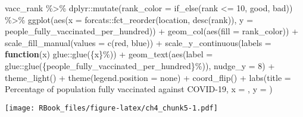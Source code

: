 \documentclass[
]{book}
\newenvironment{Shaded}{\begin{snugshade}}{\end{snugshade}}
\newcommand{\AttributeTok}[1]{\textcolor[rgb]{0.77,0.63,0.00}{#1}}
\newcommand{\ControlFlowTok}[1]{\textcolor[rgb]{0.13,0.29,0.53}{\textbf{#1}}}
\newcommand{\DecValTok}[1]{\textcolor[rgb]{0.00,0.00,0.81}{#1}}
\newcommand{\FunctionTok}[1]{\textcolor[rgb]{0.00,0.00,0.00}{#1}}
\newcommand{\NormalTok}[1]{#1}
\newcommand{\SpecialCharTok}[1]{\textcolor[rgb]{0.00,0.00,0.00}{#1}}
\newcommand{\StringTok}[1]{\textcolor[rgb]{0.31,0.60,0.02}{#1}}
\begin{document}
\begin{Shaded}
\begin{Highlighting}[]
\NormalTok{vacc\_rank }\SpecialCharTok{\%\textgreater{}\%}
\NormalTok{  dplyr}\SpecialCharTok{::}\FunctionTok{mutate}\NormalTok{(}\AttributeTok{rank\_color =} \FunctionTok{if\_else}\NormalTok{(rank }\SpecialCharTok{\textless{}=} \DecValTok{10}\NormalTok{, }\StringTok{\textquotesingle{}good\textquotesingle{}}\NormalTok{, }\StringTok{\textquotesingle{}bad\textquotesingle{}}\NormalTok{)) }\SpecialCharTok{\%\textgreater{}\%} 
  \FunctionTok{ggplot}\NormalTok{(}\FunctionTok{aes}\NormalTok{(}\AttributeTok{x =}\NormalTok{ forcats}\SpecialCharTok{::}\FunctionTok{fct\_reorder}\NormalTok{(location, }\FunctionTok{desc}\NormalTok{(rank)), }
             \AttributeTok{y =}\NormalTok{ people\_fully\_vaccinated\_per\_hundred)) }\SpecialCharTok{+}
  \FunctionTok{geom\_col}\NormalTok{(}\FunctionTok{aes}\NormalTok{(}\AttributeTok{fill =}\NormalTok{ rank\_color)) }\SpecialCharTok{+}
  \FunctionTok{scale\_fill\_manual}\NormalTok{(}\AttributeTok{values =} \FunctionTok{c}\NormalTok{(}\StringTok{\textquotesingle{}red\textquotesingle{}}\NormalTok{, }\StringTok{\textquotesingle{}blue\textquotesingle{}}\NormalTok{)) }\SpecialCharTok{+}
  \FunctionTok{scale\_y\_continuous}\NormalTok{(}\AttributeTok{labels =} \ControlFlowTok{function}\NormalTok{(x) glue}\SpecialCharTok{::}\FunctionTok{glue}\NormalTok{(}\StringTok{\textquotesingle{}\{x\}\%\textquotesingle{}}\NormalTok{)) }\SpecialCharTok{+}
  \FunctionTok{geom\_text}\NormalTok{(}\FunctionTok{aes}\NormalTok{(}\AttributeTok{label =}\NormalTok{ glue}\SpecialCharTok{::}\FunctionTok{glue}\NormalTok{(}\StringTok{\textquotesingle{}\{people\_fully\_vaccinated\_per\_hundred\}\%\textquotesingle{}}\NormalTok{)), }
            \AttributeTok{nudge\_y =} \DecValTok{8}\NormalTok{) }\SpecialCharTok{+}
  \FunctionTok{theme\_light}\NormalTok{() }\SpecialCharTok{+}
  \FunctionTok{theme}\NormalTok{(}\AttributeTok{legend.position =} \StringTok{\textquotesingle{}none\textquotesingle{}}\NormalTok{) }\SpecialCharTok{+}
  \FunctionTok{coord\_flip}\NormalTok{() }\SpecialCharTok{+}
  \FunctionTok{labs}\NormalTok{(}\AttributeTok{title =} \StringTok{\textquotesingle{}Percentage of population fully vaccinated against COVID{-}19\textquotesingle{}}\NormalTok{,}
       \AttributeTok{x =} \StringTok{\textquotesingle{}\textquotesingle{}}\NormalTok{, }\AttributeTok{y =} \StringTok{\textquotesingle{}\textquotesingle{}}\NormalTok{)}
\end{Highlighting}
\end{Shaded}

\texttt{[image: RBook\_files/figure-latex/ch4\_chunk5-1.pdf]}

  
\end{document}
